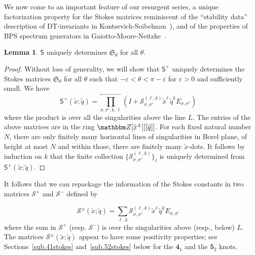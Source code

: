 \documentclass[12pt,reqno]{amsart}
\theoremstyle{definition}
\newtheorem{lemma}[theorem]{Lemma}
\def\BZ{\mathbbm Z}
\def\calS{\mathcal S}
\def\s{\sigma}
\def\tq{\tilde{q}}
\def\tx{\tilde{x}}
\def\th{\theta}
\def\tx{\tilde{x}}
\def\md{\mathbf}
\def\mfS{\mathfrak{S}}
\def\ms{\mathsf}
\newcommand{\knot}[1]{\md{#1}}
\begin{document}
We now come to an important feature of our resurgent series,
a unique factorization property for the Stokes matrices reminiscent
of the ``stability data'' description of DT-invariants in
Kontsevich-Soibelman~\cite{KS,KS:stability, KS:wall-crossing}), and
of the properties of BPS spectrum generators in
Gaiotto-Moore-Neitzke~\cite{gmn, gmn2, gmn3}. 

\begin{lemma}
  \label{lem.fac}
  $\ms{S}$
  uniquely determines $\mfS_{\th}$ for all $\th$. 
\end{lemma}

\begin{proof}
  Without loss of generality, we will show that $\ms{S}^+$ uniquely
  determines the Stokes matrices $\mfS_\th$ for all $\th$ such that
  $-\varepsilon < \th < \pi - \varepsilon$ for $\varepsilon>0$ and
  sufficiently small. We have
  \begin{equation}
    \label{SScal}
    \ms{S}^+(\tx;\tq) = \prod_{\s,\s',k,\ell}^{\longleftarrow}
    (I + \calS_{\s,\s'}^{(\ell,k)} \tx^\ell \, \tq^k E_{\s,\s'})
  \end{equation}
  where the product is over all the singularities above the line $L$.
  The entries of the above matrices are in the ring
  $\BZ[\tx^\pm][[\tq]]$.  For each fixed natural number $N$, there are
  only finitely many horizontal lines of singularities in Borel plane,
  of height at most $N$ and within those, there are finitely many
  $\tx$-dots. It follows by induction on $k$ that the finite
  collection $\{\calS_{\s,\s'}^{(\ell,k)}\}_\ell$ is uniquely
  determined from $\ms{S}^+(\tx;\tq)$.
\end{proof}

It follows that we can repackage the information of the Stokes
constants in two matrices $\calS^+$ and $\calS^-$ defined by

\begin{equation}
  \label{calS}
  \calS^\pm(\tx;\tq) = \sum_{\ell,k} \calS_{\s,\s'}^{(\ell,k)}
  \tx^\ell \, \tq^k E_{\s,\s'}
\end{equation}
where the sum in $\calS^+$ (resp. $\calS^-$) is over the singularities
above (resp., below) $L$. The matrices $\calS^\pm(\tx;\tq)$ appear to
have some positivity properties; see Sections~\ref{sub.41stokes}
and~\ref{sub.52stokes} below for the $\knot{4}_1$ and the $\knot{5}_2$
knots.
    
\end{document}
